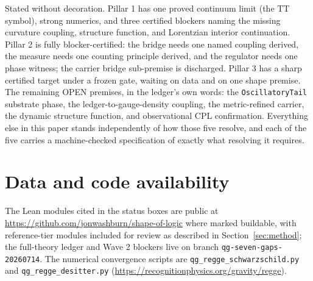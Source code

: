 \documentclass[11pt,letterpaper]{article}
\newcommand{\lean}[1]{\texttt{#1}}
\begin{document}
Stated without decoration. Pillar 1 has one proved continuum limit (the TT symbol), strong numerics, and three certified blockers naming the missing curvature coupling, structure function, and Lorentzian interior continuation. Pillar 2 is fully blocker-certified: the bridge needs one named coupling derived, the measure needs one counting principle derived, and the regulator needs one phase witness; the carrier bridge sub-premise is discharged. Pillar 3 has a sharp certified target under a frozen gate, waiting on data and on one shape premise. The remaining OPEN premises, in the ledger's own words: the \lean{OscillatoryTail} substrate phase, the ledger-to-gauge-density coupling, the metric-refined carrier, the dynamic structure function, and observational CPL confirmation. Everything else in this paper stands independently of how those five resolve, and each of the five carries a machine-checked specification of exactly what resolving it requires.

\section*{Data and code availability}
The Lean modules cited in the status boxes are public at \url{https://github.com/jonwashburn/shape-of-logic} where marked buildable, with reference-tier modules included for review as described in Section~\ref{sec:method}; the full-theory ledger and Wave 2 blockers live on branch \texttt{qg-seven-gaps-20260714}. The numerical convergence scripts are \texttt{qg\_regge\_schwarzschild.py} and \texttt{qg\_regge\_desitter.py} (\url{https://recognitionphysics.org/gravity/regge}).
\end{document}
